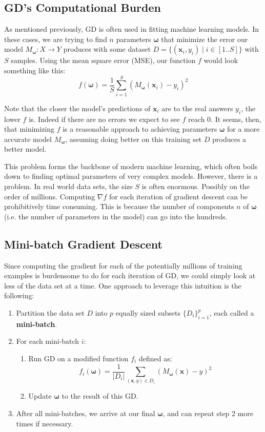 \documentclass{article}
\renewcommand\vec{\mathbf}
\begin{document}
\subsection*{GD's Computational Burden}
As mentioned previously, GD is often used in fitting machine learning models. In these cases, we are trying to find $n$ parameters $\boldsymbol\omega$ that minimize the error our model $M_{\boldsymbol\omega}:X\to Y$ produces with some dataset $D=\{(\vec x_i,y_i)\mid i\in[1..S]\}$ with $S$ samples. Using the mean square error (MSE), our function $f$ would look something like this:
$$f(\boldsymbol\omega)=\frac{1}{S}\sum^{S}_{i=1} (M_{\boldsymbol\omega}(\vec x_i)-y_i)^2$$

Note that the closer the model's predictions of $\vec x_i$ are to the real answers $y_i$, the lower $f$ is. Indeed if there are no errors we expect to see $f$ reach 0. It seems, then, that minimizing $f$ is a reasonable approach to achieving parameters $\boldsymbol\omega$ for a more accurate model $M_{\boldsymbol\omega}$, assuming doing better on this training set $D$ produces a better model.

This problem forms the backbone of modern machine learning, which often boils down to finding optimal parameters of very complex models. However, there is a problem. In real world data sets, the size $S$ is often enormous. Possibly on the order of millions. Computing $\nabla f$ for each iteration of gradient descent can be prohibitively time consuming. This is because the number of components $n$ of $\boldsymbol\omega$ (i.e. the number of parameters in the model) can go into the hundreds.

\subsection*{Mini-batch Gradient Descent}
Since computing the gradient for each of the potentially millions of training examples is burdensome to do for each iteration of GD, we could simply look at less of the data set at a time. One approach to leverage this intuition is the following:
\begin{enumerate}
  \item Partition the data set $D$ into $p$ equally sized subsets $\{D_i\}_{i=1}^p$, each called a \textbf{mini-batch}.
  \item For each mini-batch $i$:
  \begin{enumerate}
    \item Run GD on a modified function $f_i$ defined as:
    $$f_i(\boldsymbol\omega)=\frac{1}{|D_i|}\sum_{(\vec x,y)\in D_i} (M_{\boldsymbol\omega}(\vec x)-y)^2$$
    \item Update $\boldsymbol\omega$ to the result of this GD.
  \end{enumerate}
  \item After all mini-batches, we arrive at our final $\boldsymbol\omega$, and can repeat step 2 more times if necessary.
\end{enumerate}
\end{document}
